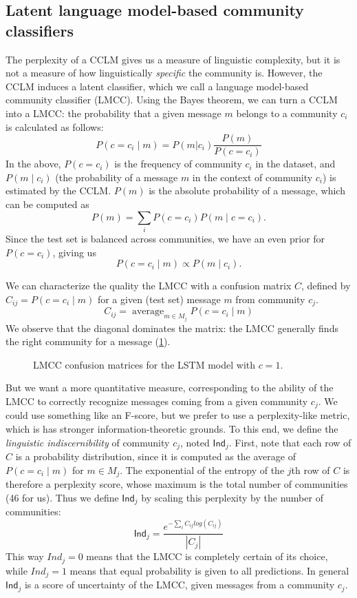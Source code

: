 \documentclass[11pt]{article}
\newcommand\Ind{\mathsf{Ind}}
\DeclareMathOperator*{\avg}{average}
\begin{document}
\subsection{Latent language model-based community classifiers}

The perplexity of a CCLM gives us a measure of linguistic complexity,
but it is not a measure of how linguistically \emph{specific} the
community is. However, the CCLM induces a latent classifier,
which we call a language model-based community classifier
(LMCC). Using the Bayes theorem, we can turn a
CCLM into a LMCC: the probability that a given message $m$
belongs to a community $c_i$ is calculated as follows:
\[P(c=c_i \mid m) = P(m | c_i)\frac {P(m)} {P(c=c_i)}\]
In the above,
$P(c=c_i)$ is the frequency of community $c_i$ in the dataset, and
$P(m \mid c_i)$ (the probability of a message $m$
in the context of community $c_i$) is estimated by the CCLM. 
$P(m)$ is the absolute
probability of a message, which can be computed as
\[P(m) = \sum_i P(c=c_i) P(m\mid c=c_i ). \]
Since the test set is balanced across communities,
we have an even prior for $P(c=c_i)$, giving us
\[P(c=c_i\mid m) \propto  P(m\mid c_i).\]

We can characterize the quality the LMCC with a confusion matrix
$C$, defined by $C_{ij} = P(c=c_i \mid m)$ for a given (test set) message $m$ 
from community $c_j$.
\[C_{ij} = \avg_{m\in M_j}P(c=c_i \mid m)\]
We observe that the diagonal dominates the matrix: the LMCC generally finds the right community for a message (\cref{fig:confusion}).
%
\begin{figure}
\caption{LMCC confusion matrices for the LSTM model with $c=1$.}
\label{fig:confusion}
\end{figure}
%
But we want a more quantitative measure, corresponding to the ability of the LMCC to correctly
recognize messages coming from a given community $c_j$. We could use
something like an F-score, but we prefer to use a perplexity-like metric,
which is has stronger information-theoretic grounds.
To this end, we define the \emph{linguistic indiscernibility} of community $c_j$, 
noted $\Ind_j$. 
First, note that each row of $C$ is a probability distribution,
since it is computed as the average of $P(c=c_i \mid m)$ for $m\in M_j$.
The exponential of the entropy of the $j$th row of \(C\) is therefore a perplexity score,
whose maximum is the total number of communities (46 for us).
Thus we define $\Ind_j$ by scaling this perplexity by the number of communities:
\[\Ind_j = \frac{e^{-\sum_i C_{ij} log(C_{ij})}}{|C_j|}\]
This way $Ind_j=0$ means that the LMCC is completely certain of its
choice, while $Ind_j=1$ means that equal probability is given to all
predictions.  In general $\Ind_j$ is a score of uncertainty of the
LMCC, given messages from a community $c_j$.
\end{document}
